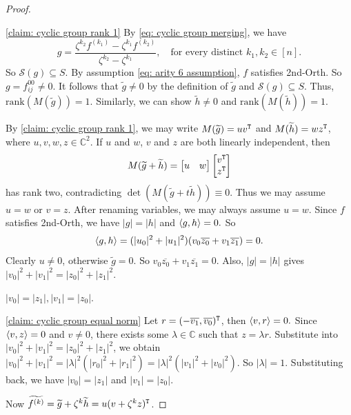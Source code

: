 \begin{proof}
\begin{claimproof}{\cref{claim: cyclic group rank 1}}
        By \eqref{eq: cyclic group merging}, we have 
        $$g=\frac{\zeta^{k_2}f^{(k_1)}-\zeta^{k_1}f^{(k_2)}}{\zeta^{k_2}-\zeta^{k_1}},\quad \text{for every distinct }k_1,k_2\in[n].$$
        So $\mathscr{S}(g)\subseteq S.$
        By assumption \eqref{eq: arity 6 assumption}, $f$ satisfies {\sc 2nd-Orth}.
        So $g=f_{ij}^{00}\neq 0.$
        It follows that $\widetilde{g}\neq 0$ by the definition of $\widetilde{g}$ and $\mathscr{S}(g)\subseteq S.$
        Thus, $\mathrm{rank}(M(\widetilde{g}))=1.$
        Similarly, we can show $\widetilde{h}\neq 0$ and $\mathrm{rank}(M(\widetilde{h}))=1.$
    \end{claimproof}
    By \cref{claim: cyclic group rank 1}, we may write $M(\widetilde{g})=uv^{\tt T}$ and $M(\widetilde{h})=wz^{\tt T}$, where $u,v,w,z\in \mathbb{C}^2.$
    If $u$ and $w$, $v$ and $z$ are both linearly independent, then $$M(\widetilde{g}+\widetilde{h})=\left[\begin{matrix}
        u & w
    \end{matrix}\right]
    \left[\begin{matrix}
        v^{\tt T} \\ z^{\tt T}
    \end{matrix}\right]$$
    has rank two, contradicting $\det(M(\widetilde{g}+t\widetilde{h}))\equiv 0.$
    Thus we may assume $u=w$ or $v=z$.
    After renaming variables, we may always assume $u=w.$
    Since $f$ satisfies {\sc 2nd-Orth}, we have $|g|=|h|$ and $\braket{g,h}=0.$
    So
    $$
    \braket{g,h}=(|u_0|^2+|u_1|^2)(v_0\overline{z_0}+v_1\overline{z_1})=0.
    $$
    Clearly $u\neq 0$, otherwise $\widetilde{g}=0.$
    So $v_0\overline{z_0}+v_1\overline{z_1}=0.$
    Also, $|g|=|h|$ gives $|v_0|^2+|v_1|^2=|z_0|^2+|z_1|^2.$ 
    \begin{claim}\label{claim: cyclic group equal norm}
        $|v_0|=|z_1|, |v_1|=|z_0|.$
    \end{claim}
    \begin{claimproof}{\cref{claim: cyclic group equal norm}}
        Let $r=(-\overline{v_1},\overline{v_0})^{\tt T}$, then $\braket{v,r}=0.$
        Since $\braket{v,z}=0$ and $v\neq 0$, there exists some $\lambda\in \mathbb{C}$ such that $z=\lambda r.$
        Substitute into $|v_0|^2+|v_1|^2=|z_0|^2+|z_1|^2$, we obtain $|v_0|^2+|v_1|^2=|\lambda|^2(|r_0|^2+|r_1|^2)=|\lambda|^2(|v_1|^2+|v_0|^2)$.
        So $|\lambda|=1.$
        Substituting back, we have $|v_0|=|z_1|$ and $|v_1|=|z_0|$.
    \end{claimproof}
    Now $\widetilde{f^{(k)}}=\widetilde{g}+\zeta^k\widetilde{h}=u(v+\zeta^k z)^{\tt T}$.

\end{proof}

